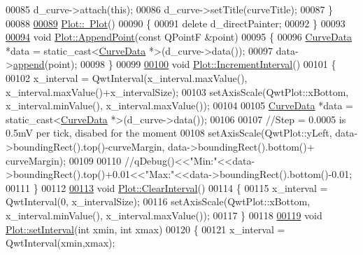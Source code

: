 \begin{DoxyCode}
00085     d\_curve->attach(\textcolor{keyword}{this});
00086     d\_curve->setTitle(curveTitle);
00087 \}
00088 
\hypertarget{plot_8cpp_source.tex_l00089}{}\hyperlink{classPlot_a277e9c79c4357b3a317d74d61dabefcf}{00089} \hyperlink{classPlot_a277e9c79c4357b3a317d74d61dabefcf}{Plot::~Plot}()
00090 \{
00091     \textcolor{keyword}{delete} d\_directPainter;
00092 \}
00093 
\hypertarget{plot_8cpp_source.tex_l00094}{}\hyperlink{classPlot_a983cc18b014a7da6a9ebd18d941a2810}{00094} \textcolor{keywordtype}{void} \hyperlink{classPlot_a983cc18b014a7da6a9ebd18d941a2810}{Plot::AppendPoint}(\textcolor{keyword}{const} QPointF &point)
00095 \{
00096     \hyperlink{classCurveData}{CurveData} *data = \textcolor{keyword}{static\_cast<}\hyperlink{classCurveData}{CurveData} *\textcolor{keyword}{>}(d\_curve->data());
00097     data->\hyperlink{classCurveData_aff1e348b77d682b9ea65e7724d5679d5}{append}(point);
00098 \}
00099 
\hypertarget{plot_8cpp_source.tex_l00100}{}\hyperlink{classPlot_a3deed9a4018d838d2c21d37e7b550fe0}{00100} \textcolor{keywordtype}{void} \hyperlink{classPlot_a3deed9a4018d838d2c21d37e7b550fe0}{Plot::IncrementInterval}()
00101 \{
00102     x\_interval = QwtInterval(x\_interval.maxValue(), x\_interval.maxValue()+x\_intervalSize);
00103     setAxisScale(QwtPlot::xBottom, x\_interval.minValue(), x\_interval.maxValue());
00104 
00105     \hyperlink{classCurveData}{CurveData} *data = \textcolor{keyword}{static\_cast<}\hyperlink{classCurveData}{CurveData} *\textcolor{keyword}{>}(d\_curve->data());
00106 
00107     \textcolor{comment}{//Step = 0.0005 is 0.5mV per tick, disabed for the moment}
00108     setAxisScale(QwtPlot::yLeft, data->boundingRect().top()-curveMargin, data->boundingRect().bottom()+
      curveMargin);
00109 
00110     \textcolor{comment}{//qDebug()<<"Min:"<<data->boundingRect().top()+0.01<<"Max:"<<data->boundingRect().bottom()-0.01;}
00111 \}
00112 
\hypertarget{plot_8cpp_source.tex_l00113}{}\hyperlink{classPlot_a02379d1d3094929aff97df8aa5c83fd6}{00113} \textcolor{keywordtype}{void} \hyperlink{classPlot_a02379d1d3094929aff97df8aa5c83fd6}{Plot::ClearInterval}()
00114 \{
00115     x\_interval = QwtInterval(0, x\_intervalSize);
00116     setAxisScale(QwtPlot::xBottom, x\_interval.minValue(), x\_interval.maxValue());
00117 \}
00118 
\hypertarget{plot_8cpp_source.tex_l00119}{}\hyperlink{classPlot_a932e846d63f6e6192485fa8402c1c7bf}{00119} \textcolor{keywordtype}{void} \hyperlink{classPlot_a932e846d63f6e6192485fa8402c1c7bf}{Plot::setInterval}(\textcolor{keywordtype}{int} xmin, \textcolor{keywordtype}{int} xmax)
00120 \{
00121     x\_interval = QwtInterval(xmin,xmax);

\end{DoxyCode}
